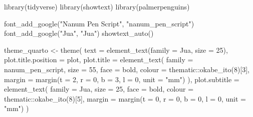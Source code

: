 \documentclass[
  letterpaper,
]{book}
\newenvironment{Shaded}{\begin{snugshade}}{\end{snugshade}}
\newcommand{\AttributeTok}[1]{\textcolor[rgb]{0.40,0.45,0.13}{#1}}
\newcommand{\DecValTok}[1]{\textcolor[rgb]{0.68,0.00,0.00}{#1}}
\newcommand{\FunctionTok}[1]{\textcolor[rgb]{0.28,0.35,0.67}{#1}}
\newcommand{\NormalTok}[1]{\textcolor[rgb]{0.00,0.23,0.31}{#1}}
\newcommand{\OtherTok}[1]{\textcolor[rgb]{0.00,0.23,0.31}{#1}}
\newcommand{\SpecialCharTok}[1]{\textcolor[rgb]{0.37,0.37,0.37}{#1}}
\newcommand{\StringTok}[1]{\textcolor[rgb]{0.13,0.47,0.30}{#1}}
\begin{document}
\begin{Shaded}
\begin{Highlighting}[]
\FunctionTok{library}\NormalTok{(tidyverse)}
\FunctionTok{library}\NormalTok{(showtext)}
\FunctionTok{library}\NormalTok{(palmerpenguins)}

\FunctionTok{font\_add\_google}\NormalTok{(}\StringTok{"Nanum Pen Script"}\NormalTok{, }\StringTok{"nanum\_pen\_script"}\NormalTok{)}
\FunctionTok{font\_add\_google}\NormalTok{(}\StringTok{"Jua"}\NormalTok{, }\StringTok{"Jua"}\NormalTok{)}
\FunctionTok{showtext\_auto}\NormalTok{()}

\NormalTok{theme\_quarto }\OtherTok{\textless{}{-}} \FunctionTok{theme}\NormalTok{(}
  \AttributeTok{text =} \FunctionTok{element\_text}\NormalTok{(}\AttributeTok{family =} \StringTok{\textquotesingle{}Jua\textquotesingle{}}\NormalTok{, }\AttributeTok{size =} \DecValTok{25}\NormalTok{),}
  \AttributeTok{plot.title.position =} \StringTok{\textquotesingle{}plot\textquotesingle{}}\NormalTok{,}
  \AttributeTok{plot.title =} \FunctionTok{element\_text}\NormalTok{(}
    \AttributeTok{family =} \StringTok{\textquotesingle{}nanum\_pen\_script\textquotesingle{}}\NormalTok{, }\AttributeTok{size =} \DecValTok{55}\NormalTok{,}
    \AttributeTok{face =} \StringTok{\textquotesingle{}bold\textquotesingle{}}\NormalTok{, }
    \AttributeTok{colour =}\NormalTok{ thematic}\SpecialCharTok{::}\FunctionTok{okabe\_ito}\NormalTok{(}\DecValTok{8}\NormalTok{)[}\DecValTok{3}\NormalTok{],}
    \AttributeTok{margin =} \FunctionTok{margin}\NormalTok{(}\AttributeTok{t =} \DecValTok{2}\NormalTok{, }\AttributeTok{r =} \DecValTok{0}\NormalTok{, }\AttributeTok{b =} \DecValTok{3}\NormalTok{, }\AttributeTok{l =} \DecValTok{0}\NormalTok{, }\AttributeTok{unit =} \StringTok{"mm"}\NormalTok{)}
\NormalTok{  ),}
  \AttributeTok{plot.subtitle =} \FunctionTok{element\_text}\NormalTok{(}
    \AttributeTok{family =} \StringTok{\textquotesingle{}Jua\textquotesingle{}}\NormalTok{, }\AttributeTok{size =} \DecValTok{25}\NormalTok{,}
    \AttributeTok{face =} \StringTok{\textquotesingle{}bold\textquotesingle{}}\NormalTok{, }
    \AttributeTok{colour =}\NormalTok{ thematic}\SpecialCharTok{::}\FunctionTok{okabe\_ito}\NormalTok{(}\DecValTok{8}\NormalTok{)[}\DecValTok{5}\NormalTok{],}
    \AttributeTok{margin =} \FunctionTok{margin}\NormalTok{(}\AttributeTok{t =} \DecValTok{0}\NormalTok{, }\AttributeTok{r =} \DecValTok{0}\NormalTok{, }\AttributeTok{b =} \DecValTok{0}\NormalTok{, }\AttributeTok{l =} \DecValTok{0}\NormalTok{, }\AttributeTok{unit =} \StringTok{"mm"}\NormalTok{)}
\NormalTok{  )}
  

\end{Highlighting}
\end{Shaded}
\end{document}
